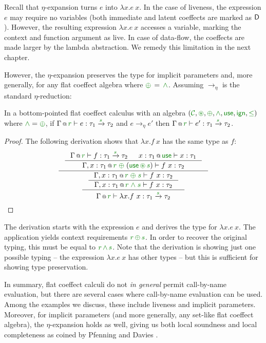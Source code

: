 Recall that $\eta$-expansion turns $e$ into $\lambda x.e~x$. In the case of liveness, the 
expression $e$ may require no variables (both immediate and latent coeffects are marked as
$\textnormal{\sffamily D}$). However, the resulting expression $\lambda x.e~x$ accesses a variable, 
marking the context and function argument as live. In case of data-flow, the coeffects are
made larger by the lambda abstraction. We remedy this limitation in the next chapter.

However, the $\eta$-expansion preserves the type for implicit parameters and, more generally,
for any flat coeffect algebra where $\cpar \,=\, \czip$. Assuming $\rightarrow_\eta$ is the 
standard $\eta$-reduction:

\begin{theorem}
In a bottom-pointed flat coeffect calculus with an algebra $(\C, \cseq, \cpar, \czip, \cunit, \czero, \cleq)$ 
where $\czip = \cpar$, if $\coctx{\Gamma}{\cclrd{r}} \vdash e : \tau_1 \xrightarrow{\cclrd{s}} \tau_2$ 
and $e \rightarrow_\eta e'$ then $\coctx{\Gamma}{\cclrd{r}} \vdash e' : \tau_1 \xrightarrow{\cclrd{s}} \tau_2 $.
\end{theorem}
\begin{proof}
The following derivation shows that $\lambda x.f~x$ has the same type as $f$:
\begin{equation*}
\inference
  { \inference
    { \coctx{\Gamma}{\cclrd{r}} \vdash f : \tau_1 \xrightarrow{\cclrd{s}} \tau_2 &
      \coctx{x:\tau_1}{\cunit} \vdash x:\tau_1 }
    { \coctx{\Gamma, x:\tau_1}{\cclrd{r} \;\cpar\; (\cunit \,\cseq\, \cclrd{s}) } \vdash f~x : \tau_2 } }
  { \inference
    { \inference
      { \coctx{\Gamma, x:\tau_1}{\cclrd{r} \;\cpar\; \cclrd{s} } \vdash f~x : \tau_2 }
      { \coctx{\Gamma, x:\tau_1}{\cclrd{r} \;\czip\; \cclrd{s} } \vdash f~x : \tau_2 } }
    { \coctx{\Gamma}{ \cclrd{r} } \vdash \lambda x.f~x : \tau_1 \xrightarrow{\cclrd{s}} \tau_2 } }
\end{equation*}
\end{proof}

\noindent
The derivation starts with the expression $e$ and derives the type for $\lambda x.e~x$. The
application yields context requirements $\cclrd{r}\,\cpar\,\cclrd{s}$. In order to recover the
original typing, this must be equal to $\cclrd{r}\,\czip\,\cclrd{s}$. Note that the derivation
is showing just one possible typing -- the expression $\lambda x.e~x$ has other types -- but
this is sufficient for showing type preservation.

In summary, flat coeffect calculi do not \emph{in general} permit call-by-name evaluation, but
there are several cases where call-by-name evaluation can be used. Among the examples we discuss,
these include liveness and implicit parameters. Moreover, for implicit parameters (and more
generally, any set-like flat coeffect algebra), the $\eta$-expansion holds as well, giving us
both local soundness and local completeness as coined by Pfenning and Davies \cite{logic-modal-reconstruction}.

